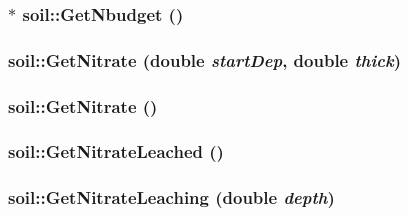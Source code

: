 \label{classsoil_aed2c30f9e15bc87564798a5bc67416b7}
\hypertarget{classsoil_ac8c18b42bdf8d088ce09704f4d6d982f}{
\subsubsection[{GetNbudget}]{$\ast$ soil::GetNbudget ()}}
\label{classsoil_ac8c18b42bdf8d088ce09704f4d6d982f}
\hypertarget{classsoil_a32c15401ff24079af4f9a8ac569bbb01}{
\subsubsection[{GetNitrate}]{ soil::GetNitrate (double {\em startDep}, \/  double {\em thick})}}
\label{classsoil_a32c15401ff24079af4f9a8ac569bbb01}
\hypertarget{classsoil_a111760bc77c25164c82b3dbccf5e443a}{
\subsubsection[{GetNitrate}]{ soil::GetNitrate ()}}
\label{classsoil_a111760bc77c25164c82b3dbccf5e443a}
\hypertarget{classsoil_a76265ee1854179bc17203b1b2df1e4db}{
\subsubsection[{GetNitrateLeached}]{ soil::GetNitrateLeached ()}}
\label{classsoil_a76265ee1854179bc17203b1b2df1e4db}
\hypertarget{classsoil_a349f7aeac285f43f4afb6d35eadcc194}{
\subsubsection[{GetNitrateLeaching}]{ soil::GetNitrateLeaching (double {\em depth})}}

